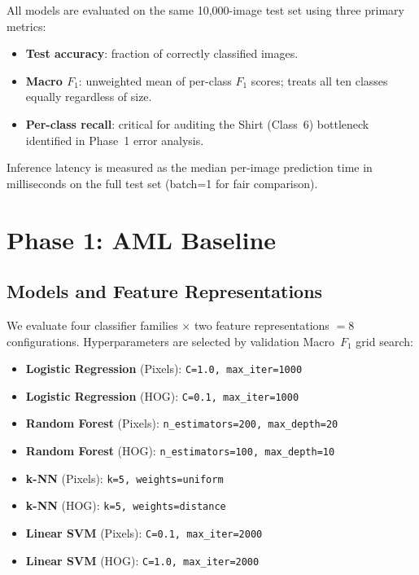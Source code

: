 \documentclass[conference]{IEEEtran}
\newcommand{\code}[1]{\texttt{#1}}
\begin{document}
All models are evaluated on the same 10,000-image test set using three
primary metrics:
\begin{itemize}
  \item \textbf{Test accuracy}: fraction of correctly classified images.
  \item \textbf{Macro $F_1$}: unweighted mean of per-class $F_1$ scores;
    treats all ten classes equally regardless of size.
  \item \textbf{Per-class recall}: critical for auditing the Shirt (Class~6)
    bottleneck identified in Phase~1 error analysis.
\end{itemize}
Inference latency is measured as the median per-image prediction time
in milliseconds on the full test set (batch=1 for fair comparison).

\section{Phase 1: AML Baseline}\label{sec:phase1}

\subsection{Models and Feature Representations}

We evaluate four classifier families $\times$ two feature representations
$= 8$ configurations. Hyperparameters are selected by validation Macro~$F_1$
grid search:

\begin{itemize}
  \item \textbf{Logistic Regression} (Pixels): \code{C=1.0, max\_iter=1000}
  \item \textbf{Logistic Regression} (HOG): \code{C=0.1, max\_iter=1000}
  \item \textbf{Random Forest} (Pixels): \code{n\_estimators=200, max\_depth=20}
  \item \textbf{Random Forest} (HOG): \code{n\_estimators=100, max\_depth=10}
  \item \textbf{k-NN} (Pixels): \code{k=5, weights=uniform}
  \item \textbf{k-NN} (HOG): \code{k=5, weights=distance}
  \item \textbf{Linear SVM} (Pixels): \code{C=0.1, max\_iter=2000}
  \item \textbf{Linear SVM} (HOG): \code{C=1.0, max\_iter=2000}
\end{itemize}
\end{document}
